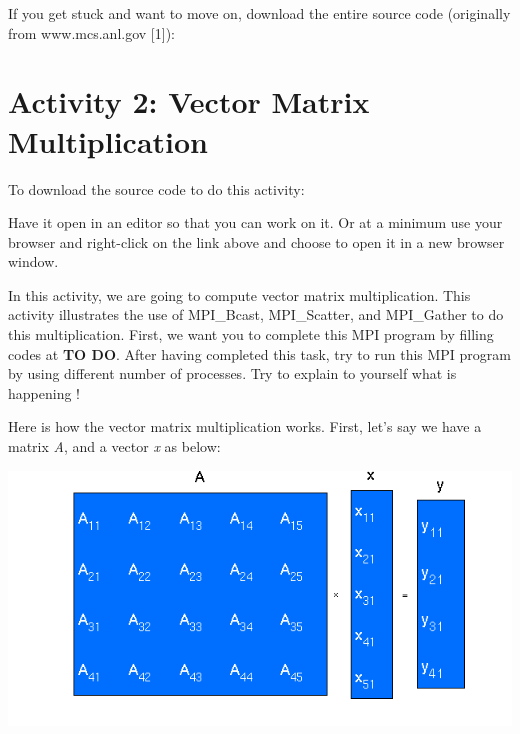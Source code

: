 \documentclass[letterpaper,10pt,openany,oneside]{sphinxmanual}
\begin{document}
If you get stuck and want to move on, download the entire source code (originally from www.mcs.anl.gov {[}1{]}):


\section{Activity 2: Vector Matrix Multiplication}
\label{CompileAndActivity/compileandactivity:activity-2-vector-matrix-multiplication}
To download the source code to do this activity:

Have it open in an editor so that you can work on it.  Or at a minimum use your browser and right-click on the link above and choose to open it in a new browser window.

In this activity, we are going to compute vector matrix multiplication. This activity illustrates the use of MPI\_Bcast, MPI\_Scatter, and MPI\_Gather to do this multiplication. First, we want you to complete this MPI program by filling codes at \textbf{TO DO}. After having completed this task, try to run this MPI program by using different number of processes. Try to explain to yourself what is happening !

Here is how the vector matrix multiplication works. First, let's say we have a matrix \emph{A}, and a vector \emph{x} as below:

{\hfill\includegraphics{vector_matrix_multi.png}\hfill}
\end{document}
